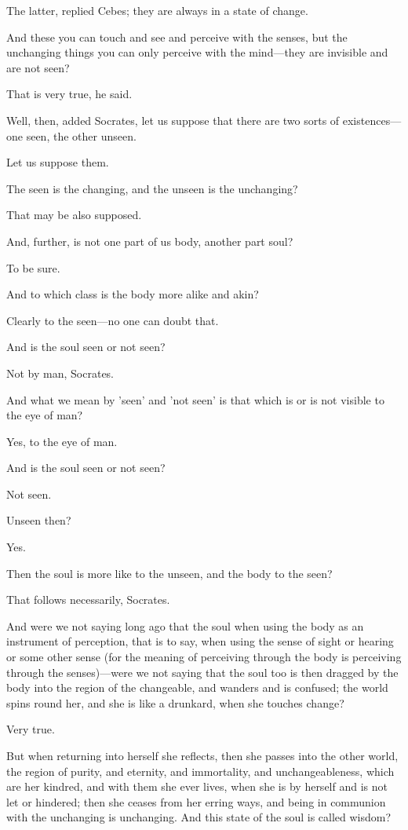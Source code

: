 The latter, replied Cebes; they are always in a state of change.

And these you can touch and see and perceive with the senses, but the
unchanging things you can only perceive with the mind—they are
invisible and are not seen?

That is very true, he said.

Well, then, added Socrates, let us suppose that there are two sorts of
existences—one seen, the other unseen.

Let us suppose them.

The seen is the changing, and the unseen is the unchanging?

That may be also supposed.

And, further, is not one part of us body, another part soul?

To be sure.

And to which class is the body more alike and akin?

Clearly to the seen—no one can doubt that.

And is the soul seen or not seen?

Not by man, Socrates.

And what we mean by 'seen' and 'not seen' is that which is or is not
visible to the eye of man?

Yes, to the eye of man.

And is the soul seen or not seen?

Not seen.

Unseen then?

Yes.

Then the soul is more like to the unseen, and the body to the seen?

That follows necessarily, Socrates.

And were we not saying long ago that the soul when using the body as an
instrument of perception, that is to say, when using the sense of sight or
hearing or some other sense (for the meaning of perceiving through the
body is perceiving through the senses)—were we not saying that the
soul too is then dragged by the body into the region of the changeable,
and wanders and is confused; the world spins round her, and she is like a
drunkard, when she touches change?

Very true.

But when returning into herself she reflects, then she passes into the
other world, the region of purity, and eternity, and immortality, and
unchangeableness, which are her kindred, and with them she ever lives,
when she is by herself and is not let or hindered; then she ceases from
her erring ways, and being in communion with the unchanging is unchanging.
And this state of the soul is called wisdom?

